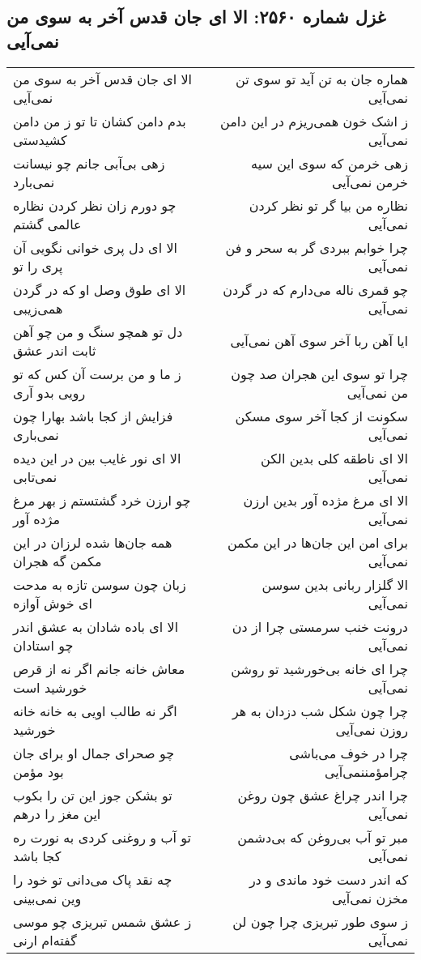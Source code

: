 \begin{center}
\section*{غزل شماره ۲۵۶۰: الا ای جان قدس آخر به سوی من نمی‌آیی}
\label{sec:2560}
\begin{longtable}{l p{0.5cm} r}
الا ای جان قدس آخر به سوی من نمی‌آیی
&&
هماره جان به تن آید تو سوی تن نمی‌آیی
\\
بدم دامن کشان تا تو ز من دامن کشیدستی
&&
ز اشک خون همی‌ریزم در این دامن نمی‌آیی
\\
زهی بی‌آبی جانم چو نیسانت نمی‌بارد
&&
زهی خرمن که سوی این سیه خرمن نمی‌آیی
\\
چو دورم زان نظر کردن نظاره عالمی گشتم
&&
نظاره من بیا گر تو نظر کردن نمی‌آیی
\\
الا ای دل پری خوانی نگویی آن پری را تو
&&
چرا خوابم ببردی گر به سحر و فن نمی‌آیی
\\
الا ای طوق وصل او که در گردن همی‌زیبی
&&
چو قمری ناله می‌دارم که در گردن نمی‌آیی
\\
دل تو همچو سنگ و من چو آهن ثابت اندر عشق
&&
ایا آهن ربا آخر سوی آهن نمی‌آیی
\\
ز ما و من برست آن کس که تو رویی بدو آری
&&
چرا تو سوی این هجران صد چون من نمی‌آیی
\\
فزایش از کجا باشد بهارا چون نمی‌باری
&&
سکونت از کجا آخر سوی مسکن نمی‌آیی
\\
الا ای نور غایب بین در این دیده نمی‌تابی
&&
الا ای ناطقه کلی بدین الکن نمی‌آیی
\\
چو ارزن خرد گشتستم ز بهر مرغ مژده آور
&&
الا ای مرغ مژده آور بدین ارزن نمی‌آیی
\\
همه جان‌ها شده لرزان در این مکمن گه هجران
&&
برای امن این جان‌ها در این مکمن نمی‌آیی
\\
زبان چون سوسن تازه به مدحت ای خوش آوازه
&&
الا گلزار ربانی بدین سوسن نمی‌آیی
\\
الا ای باده شادان به عشق اندر چو استادان
&&
درونت خنب سرمستی چرا از دن نمی‌آیی
\\
معاش خانه جانم اگر نه از قرص خورشید است
&&
چرا ای خانه بی‌خورشید تو روشن نمی‌آیی
\\
اگر نه طالب اویی به خانه خانه خورشید
&&
چرا چون شکل شب دزدان به هر روزن نمی‌آیی
\\
چو صحرای جمال او برای جان بود مؤمن
&&
چرا در خوف می‌باشی چرامؤمننمی‌آیی
\\
تو بشکن جوز این تن را بکوب این مغز را درهم
&&
چرا اندر چراغ عشق چون روغن نمی‌آیی
\\
تو آب و روغنی کردی به نورت ره کجا باشد
&&
مبر تو آب بی‌روغن که بی‌دشمن نمی‌آیی
\\
چه نقد پاک می‌دانی تو خود را وین نمی‌بینی
&&
که اندر دست خود ماندی و در مخزن نمی‌آیی
\\
ز عشق شمس تبریزی چو موسی گفته‌ام ارنی
&&
ز سوی طور تبریزی چرا چون لن نمی‌آیی
\\
\end{longtable}
\end{center}

